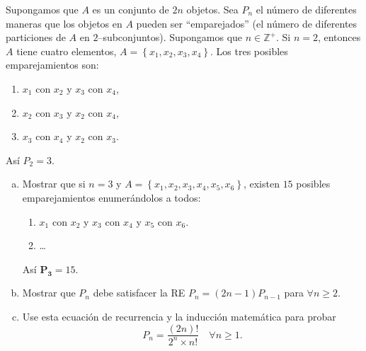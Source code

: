 \begin{exercise}
Supongamos que $A$ es un conjunto de $2n$ objetos. Sea $P_{n}$ el número de diferentes maneras que los objetos en $A$ pueden ser ``emparejados'' (el número de diferentes particiones de $A$ en $2$--subconjuntos). Supongamos que $n\in\mathds{Z}^{+}$. Si $n=2$, entonces $A$ tiene cuatro elementos, $A=\left\{x_1,x_2,x_3,x_4\right\}$. Los tres posibles emparejamientos son:
\begin{enumerate}
	\item $x_{1}$ con $x_{2}$ y $x_{3}$ con $x_{4}$,
	\item $x_{2}$ con $x_{3}$ y $x_{2}$ con $x_{4}$,
	\item $x_{3}$ con $x_{4}$ y $x_{2}$ con $x_{3}$.
\end{enumerate}
Así $P_{2}=3$.

\begin{enumerate}[(a)]%
	\item Mostrar que si $n=3$ y $A=\left\{x_{1},x_{2},x_{3},x_{4},x_{5},x_{6}\right\}$, existen $15$ posibles emparejamientos enumerándolos a todos:
	\begin{enumerate}
		\item $x_{1}$ con $x_{2}$ y $x_{3}$ con $x_{4}$ y $x_{5}$ con $x_{6}$.
		\item \ldots
	\end{enumerate}
	Así $\bm{P_3}=15$.
	\item Mostrar que $P_{n}$ debe satisfacer la RE $P_{n}=(2n-1)P_{n-1}$ para $\forall n\geq2$.
	\item Use esta ecuación de recurrencia y la inducción matemática para probar \[ P_{n}=\frac{(2n)!}{2^n\times n!}\quad\forall n\geq 1. \]
\end{enumerate}

\end{exercise}

